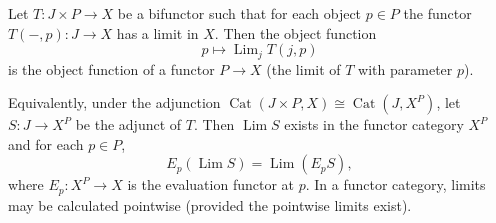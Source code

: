Let $T : J \times P \rightarrow X$ be a bifunctor such that for each object $p \in P$ the functor $T(-, p) : J \rightarrow X$ has a limit in $X$. Then the object function
$$p \mapsto \operatorname{Lim}_j T(j, p)$$
is the object function of a functor $P \rightarrow X$ (the limit of $T$ with parameter $p$).

Equivalently, under the adjunction $\operatorname{Cat}(J \times P, X) \cong \operatorname{Cat}(J, X^P)$, let $S : J \rightarrow X^P$ be the adjunct of $T$. Then $\operatorname{Lim} S$ exists in the functor category $X^P$ and for each $p \in P$,
$$E_p(\operatorname{Lim} S) = \operatorname{Lim}(E_p S),$$
where $E_p : X^P \rightarrow X$ is the evaluation functor at $p$. In a functor category, limits may be calculated pointwise (provided the pointwise limits exist).
